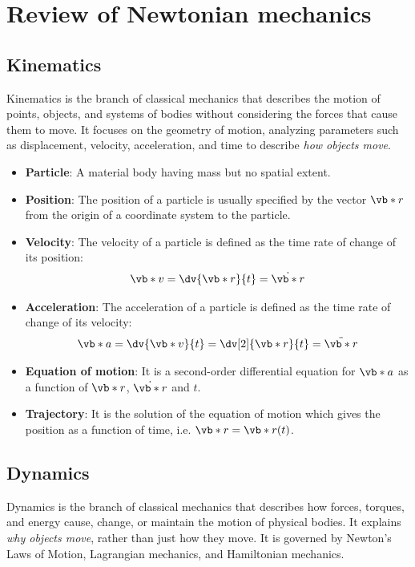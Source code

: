 \section{Review of Newtonian mechanics}

\subsection{Kinematics}
Kinematics is the branch of classical mechanics that describes the motion of points, objects, and systems of bodies without considering the forces that cause them to move. It focuses on the geometry of motion, analyzing parameters such as displacement, velocity, acceleration, and time to describe \textit{how objects move}.

\begin{itemize}
	\item \textbf{Particle}: A material body having mass but no spatial extent.
	
	\item \textbf{Position}: The position of a particle is usually specified by the vector $\vb*{r}$ from the origin of a coordinate system to the particle.
	
	\item \textbf{Velocity}: The velocity of a particle is defined as the time rate of change of its position:
	\begin{align*}
		\vb*{v}=\dv{\vb*{r}}{t}=\dot{\vb*{r}}
	\end{align*}
	
	\item \textbf{Acceleration}: The acceleration of a particle is defined as the time rate of change of its velocity:
	\begin{align*}
		\vb*{a}=\dv{\vb*{v}}{t}=\dv[2]{\vb*{r}}{t}=\ddot{\vb*{r}}
	\end{align*}
	
	\item \textbf{Equation of motion}: It is a second-order differential equation for $\vb*{a}$ as a function of $\vb*{r}$, $\dot{\vb*{r}}$ and $t$.
	
	\item \textbf{Trajectory}: It is the solution of the equation of motion which gives the position as a function of time, i.e. $\vb*{r}=\vb*{r}(t)$.
\end{itemize}

\subsection{Dynamics}
Dynamics is the branch of classical mechanics that describes how forces, torques, and energy cause, change, or maintain the motion of physical bodies. It explains \textit{why objects move}, rather than just how they move. It is governed by Newton's Laws of Motion, Lagrangian mechanics, and Hamiltonian mechanics.

